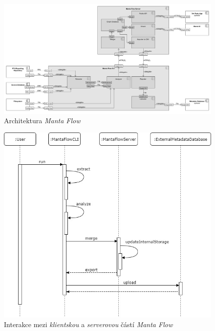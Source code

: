 \begin{figure}
\begin{center}
\includegraphics[width=14cm]{figures/flow_comp}
\caption{Architektura \textit{Manta Flow}}
\label{fig:ana-flow-comp}
\end{center}
\end{figure}

\begin{figure}
\begin{center}
\includegraphics[width=14cm]{figures/flow_seq}
\caption{Interakce mezi \textit{klientskou} a \textit{serverovou} částí \textit{Manta Flow}}
\label{fig:ana-flow-seq}
\end{center}
\end{figure}

